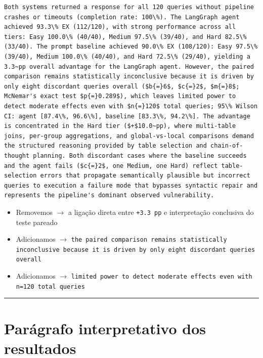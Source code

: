 \documentclass[11pt,a4paper]{article}
\begin{document}
\begin{finalblock}
\begin{lstlisting}[style=texsnippet]
Both systems returned a response for all 120 queries without pipeline crashes or timeouts (completion rate: 100\%). The LangGraph agent achieved 93.3\% EX (112/120), with strong performance across all tiers: Easy 100.0\% (40/40), Medium 97.5\% (39/40), and Hard 82.5\% (33/40). The prompt baseline achieved 90.0\% EX (108/120): Easy 97.5\% (39/40), Medium 100.0\% (40/40), and Hard 72.5\% (29/40), yielding a 3.3~pp overall advantage for the LangGraph agent. However, the paired comparison remains statistically inconclusive because it is driven by only eight discordant queries overall ($b{=}6$, $c{=}2$, $m{=}8$; McNemar's exact test $p{=}0.289$), which leaves limited power to detect moderate effects even with $n{=}120$ total queries; 95\% Wilson CI: agent [87.4\%, 96.6\%], baseline [83.3\%, 94.2\%]. The advantage is concentrated in the Hard tier ($+$10.0~pp), where multi-table joins, per-group aggregations, and global-vs-local comparisons demand the structured reasoning provided by table selection and chain-of-thought planning. Both discordant cases where the baseline succeeds and the agent fails ($c{=}2$, one Medium, one Hard) reflect table-selection errors that propagate semantically plausible but incorrect queries to execution a failure mode that bypasses syntactic repair and represents the pipeline's dominant observed vulnerability.
\end{lstlisting}
\end{finalblock}

\begin{trackblock}
\begin{itemize}
  \item Removemos $\to$ a ligação direta entre \texttt{+3.3 pp} e interpretação conclusiva do teste pareado
  \item Adicionamos $\to$ \texttt{the paired comparison remains statistically inconclusive because it is driven by only eight discordant queries overall}
  \item Adicionamos $\to$ \texttt{limited power to detect moderate effects even with n=120 total queries}
\end{itemize}
\end{trackblock}

\bigskip\hrule\bigskip

\section{Parágrafo interpretativo dos resultados}
\end{document}
